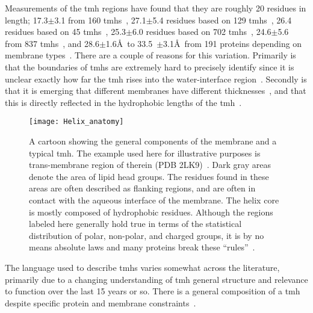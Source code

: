 Measurements of the \gls{tmh} regions have found that they are roughly 20 residues in length; 17.3$\pm$3.1 from 160 \gls{tmh}s~\cite{Hildebrand2004}, 27.1$\pm$5.4 residues based on 129 \gls{tmh}s~\cite{Ulmschneider2001}, 26.4 residues based on 45 \gls{tmh}s~\cite{Bowie1997}, 25.3$\pm$6.0 residues based on 702 \gls{tmh}s~\cite{Cuthbertson2005}, 24.6$\pm$5.6 from 837 \gls{tmh}s~\cite{Baeza-Delgado2013}, and 28.6$\pm$1.6\AA~to 33.5~$\pm$3.1\AA~from 191 proteins depending on membrane types~\cite{Pogozheva2013}. There are a couple of reasons for this variation. Primarily is that the boundaries of \gls{tmh}s are extremely hard to precisely identify since it is unclear exactly how far the \gls{tmh} rises into the water-interface region~\cite{VonHeijne2006}. Secondly is that it is emerging that different membranes have different thicknesses~\cite{VanMeer2008}, and that this is directly reflected in the hydrophobic lengths of the \gls{tmh}~\cite{Sharpe2010, Pogozheva2013}.
\begin{figure}[!ht]
\centering
\texttt{[image: Helix\_anatomy]}
\caption{A cartoon showing the general components of the membrane and a typical \gls{tmh}. The example used here for illustrative purposes is trans-membrane region of therein (PDB 2LK9)~\cite{Skasko2012}. Dark gray areas denote the area of lipid head groups. The residues found in these areas are often described as flanking regions, and are often in contact with the aqueous interface of the membrane. The helix core is mostly composed of hydrophobic residues. Although the regions labeled here generally hold true in terms of the statistical distribution of polar, non-polar, and charged groups, it is by no means absolute laws and many proteins break these ``rules''~\cite{Sharpe2010, Baeza-Delgado2013, Pogozheva2013}. }
\label{fig:helixcartoon1}
\end{figure}




The language used to describe \gls{tmh}s varies somewhat across the literature, primarily due to a changing understanding of \gls{tmh} general structure and relevance to function over the last 15 years or so. There is a general composition of a \gls{tmh} despite specific protein and membrane constraints~\cite{Sharpe2010}.

